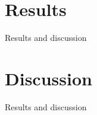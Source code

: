 \section{Results}
Results and discussion

\lipsum[1-2]
\section{Discussion}
Results and discussion

\lipsum[1-2]
